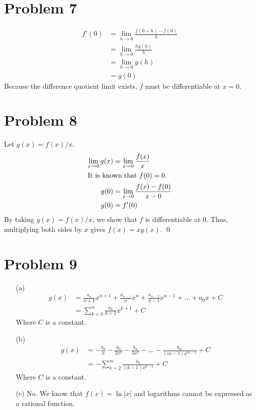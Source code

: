 \documentclass{article}
\newcommand*{\problem}[1]{\section*{Problem #1}}
\newcommand*{\limit}[2][x]{\ensuremath{\displaystyle\lim_{#1\to#2}}}
\begin{document}
\problem{7}
\begin{align*}
	f'(0)&=\limit[h]{0}\frac{f(0+h)-f(0)}{h} \\
	&=\limit[h]{0}\frac{hg(h)}{h} \\
	&=\limit[h]{0}g(h) \\
	&=g(0)
\end{align*}
Because the difference quotient limit exists, $f$ must be differentiable at $x=0$.

\problem{8}
Let $g(x)=f(x)/x$.
\begin{align*}
	\limit{0}g(x)&=\limit{0}\frac{f(x)}{x} \\
	\intertext{It is known that $f(0)=0$.}
	g(0)&=\limit{0}\frac{f(x)-f(0)}{x-0} \\
	g(0)&=f'(0)
\end{align*}
By taking $g(x)=f(x)/x$, we show that $f$ is differentiable at $0$. Thus, multiplying both sides by $x$ gives $f(x)=xg(x)$. \qed

\problem{9}
\begin{itemize}
	\item[(a)]
	\begin{align*}
		g(x)&=\frac{a_n}{n+1}x^{n+1}+\frac{a_{n-1}}{n}x^n+\frac{a_{n-2}}{n-1}x^{n-1}+\ldots+a_0x+C \\
		&=\sum_{k=0}^{n}\frac{a_k}{k+1}x^{k+1}+C
	\end{align*}
	Where $C$ is a constant.

	\item[(b)]
	\begin{align*}
		g(x)&=-\frac{b_2}{x}-\frac{b_3}{2x^2}-\frac{b_4}{3x^3}-\ldots-\frac{b_m}{(m-1)x^{m-1}}+C \\
		&=-\sum_{k=2}^{m}\frac{b_k}{(k-1)x^{k-1}}+C
	\end{align*}
	Where $C$ is a constant.
	
	\item[(c)]
	No. We know that $f(x)=\ln|x|$ and logarithms cannot be expressed as a rational function.
\end{itemize}
\end{document}
